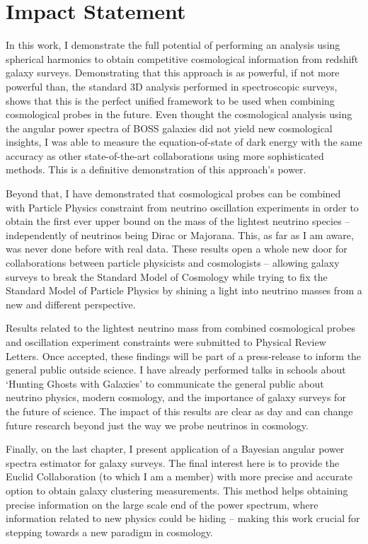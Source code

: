 \chapter*{Impact Statement}
\label{sec:impact}
\vspace*{-10mm}

In this work, I demonstrate the full potential of performing an analysis using spherical harmonics to obtain competitive cosmological information from redshift galaxy surveys. Demonstrating that this approach is as powerful, if not more powerful than, the standard 3D analysis performed in spectroscopic surveys, shows that this is the perfect unified framework to be used when combining cosmological probes in the future. Even thought the cosmological analysis using the angular power spectra of BOSS galaxies did not yield new cosmological insights, I was able to measure the equation-of-state of dark energy with the same accuracy as other state-of-the-art collaborations using more sophisticated methods. This is a definitive demonstration of this approach's power.

\qquad Beyond that, I have demonstrated that cosmological probes can be combined with Particle Physics constraint from neutrino oscillation experiments in order to obtain the first ever upper bound on the mass of the lightest neutrino species -- independently of neutrinos being Dirac or Majorana. This, as far as I am aware, was never done before with real data. These results open a whole new door for collaborations between particle physicists and cosmologists -- allowing galaxy surveys to break the Standard Model of Cosmology while trying to fix the Standard Model of Particle Physics by shining a light into neutrino masses from a new and different perspective.

\qquad Results related to the lightest neutrino mass from combined cosmological probes and oscillation experiment constraints were submitted to Physical Review Letters. Once accepted, these findings will be part of a press-release to inform the general public outside science. I have already performed talks in schools about `Hunting Ghosts with Galaxies' to communicate the general public about neutrino physics, modern cosmology, and the importance of galaxy surveys for the future of science. The impact of this results are clear as day and can change future research beyond just the way we probe neutrinos in cosmology.

\qquad Finally, on the last chapter, I present application of a Bayesian angular power spectra estimator for galaxy surveys. The final interest here is to provide the Euclid Collaboration (to which I am a member) with more precise and accurate option to obtain galaxy clustering measurements. This method helps obtaining precise information on the large scale end of the power spectrum, where information related to new physics could be hiding -- making this work crucial for stepping towards a new paradigm in cosmology.
